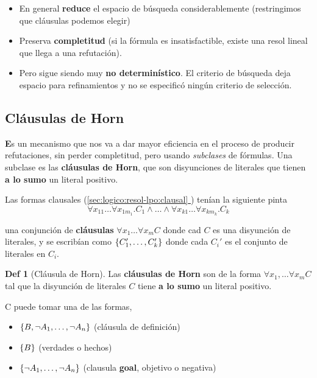 \documentclass{report}
\newcommand*{\fullref}[1]{\hyperref[{#1}]{\autoref*{#1} \nameref*{#1}}}
\theoremstyle{definition} %
\newtheorem*{definition*}{Def}
\newenvironment{nota}[1]
    {\begin{leftbar}\textbf{#1}}
    {\end{leftbar}}
\begin{document}
\begin{itemize}
    \item En general \textbf{reduce} el espacio de búsqueda considerablemente
    (restringimos que cláusulas podemos elegir)
    \item Preserva \textbf{completitud} (si la fórmula es insatisfactible,
    existe una resol lineal que llega a una refutación).
    \item Pero sigue siendo muy \textbf{no determinístico}. El criterio de
    búsqueda deja espacio para refinamientos y no se especificó ningún criterio
    de selección.
\end{itemize}

\subsection{Cláusulas de Horn}

\begin{nota}
Es un mecanismo que nos va a dar mayor eficiencia en el proceso de producir
refutaciones, sin perder completitud, pero usando \textit{subclases} de
fórmulas. Una subclase es las \textbf{cláusulas de Horn}, que son disyunciones
de literales que tienen \textbf{a lo sumo} un literal positivo.

Las formas clausales (\fullref{sec:logico:resol-lpo:clausal}) tenían la
siguiente pinta
\[
    \forall x_{11}\dots \forall x_{1m_1} .C_1 \wedge \dots \wedge
    \forall x_{k1}\dots \forall x_{km_k} .C_k
\]

una conjunción de \textbf{cláusulas} $\forall x_1 \dots \forall x_m C$ donde cad
$C$ es una disyunción de literales, y se escribían como $\{ C_1', \dots,
C_k' \}$ donde cada $C_i'$ es el conjunto de literales en $C_i$.
\end{nota}

\begin{definition*}[Cláusula de Horn]
    Las \textbf{cláusulas de Horn} son de la forma
    $\forall x_1, \dots \forall x_m C$ tal que la disyunción de literales $C$
    tiene \textbf{a lo sumo} un literal positivo.

    C puede tomar una de las formas,
    \begin{itemize}
        \item $\{ B, \neg A_1, \dots, \neg A_n \}$ (cláusula de definición)
        \item $\{ B \}$ (verdades o hechos)
        \item $\{ \neg A_1, \dots, \neg A_n \}$ (clausula \textbf{goal},
        objetivo o negativa)
    \end{itemize}
\end{definition*}
\end{document}
